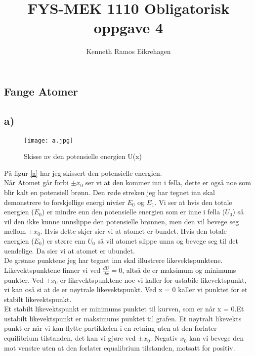 \documentclass[a4paper,12pt,norsk]{article}
\title{FYS-MEK 1110 Obligatorisk oppgave 4}
\author{Kenneth Ramos Eikrehagen}
\begin{document}
\maketitle
\begin{center}
\section*{Fange Atomer}
\end{center}

\subsection*{a)}
\begin{figure}[h!]
\texttt{[image: a.jpg]} 
\caption{Skisse av den potensielle energien U(x)}
\label{a}
\end{figure}

På figur \vref{a} har jeg skissert den potensielle energien.\\ 
Når Atomet går forbi $\pm x_0$ ser vi at den kommer inn i fella, dette er også noe som blir kalt en potensiell brønn. Den røde streken jeg har tegnet inn skal demonstrere to forskjellige energi nivåer $E_0$ og $E_1$. Vi ser at hvis den totale energien ($E_0$) er mindre enn den potensielle energien som er inne i fella ($U_0$) så vil den ikke kunne unnslippe den potensielle brønnen, men den vil bevege seg mellom $\pm x_0$. Hvis dette skjer sier vi at atomet er bundet. Hvis den totale energien ($E_0$) er større enn $U_0$ så vil atomet slippe unna og bevege seg til det uendelige. Da sier vi at atomet er ubundet. \\
De grønne punktene jeg har tegnet inn skal illustrere likevektspunktene. Likevektspunktene finner vi ved $\frac{dU}{dx} = 0$, altså de er maksimum og minimums punkter. Ved $\pm x_0$ er likevektspunktene noe vi kaller for ustabile likevektspunkt, vi kan oså si at de er nøytrale likevektspunkt. Ved x = 0 kaller vi punktet for et stabilt likevektspunkt.\\ 
Et stabilt likevektspunkt er minimums punktet til kurven, som er når x = 0.Et ustabilt likevektspunkt er maksimums punktet til grafen. Et nøytralt likevekts punkt er når vi kan flytte partikkelen i en retning uten at den forlater equilibrium tilstanden, det kan vi gjøre ved $\pm x_0$. Negativ $x_0$ kan vi bevege den mot venstre uten at den forlater equalibrium tilstanden, motsatt for positiv. 
\end{document}
